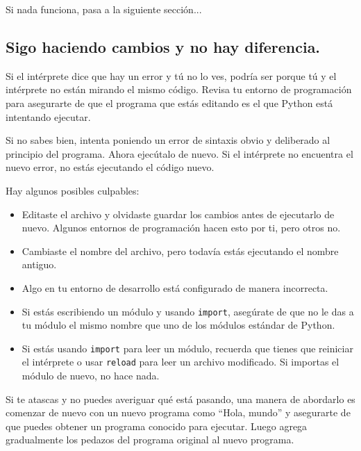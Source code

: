 \documentclass[10pt]{book}
\begin{document}
Si nada funciona, pasa a la siguiente sección...


\subsection{Sigo haciendo cambios y no hay diferencia.}

Si el intérprete dice que hay un error y tú no lo ves,
podría ser porque tú y el intérprete no están mirando el mismo
código.  Revisa tu entorno de programación para asegurarte de que el
programa que estás editando es el que Python está intentando ejecutar.

Si no sabes bien, intenta poniendo un error de sintaxis obvio y deliberado
al principio del programa.  Ahora ejecútalo de nuevo.  Si el
intérprete no encuentra el nuevo error, no estás ejecutando el
código nuevo.

Hay algunos posibles culpables:

\begin{itemize}

\item Editaste el archivo y olvidaste guardar los cambios antes de
ejecutarlo de nuevo.  Algunos entornos de programación hacen esto
por ti, pero otros no.

\item Cambiaste el nombre del archivo, pero todavía estás ejecutando
el nombre antiguo.

\item Algo en tu entorno de desarrollo está configurado
de manera incorrecta.

\item Si estás escribiendo un módulo y usando {\tt import},
asegúrate de que no le das a tu módulo el mismo nombre que uno
de los módulos estándar de Python.

\item Si estás usando {\tt import} para leer un módulo, recuerda
que tienes que reiniciar el intérprete o usar {\tt reload}
para leer un archivo modificado.  Si importas el módulo de nuevo,
no hace nada.

\end{itemize}

Si te atascas y no puedes averiguar qué está pasando, una
manera de abordarlo es comenzar de nuevo con un nuevo programa como ``Hola, mundo''
y asegurarte de que puedes obtener un programa conocido para ejecutar.  Luego agrega gradualmente
los pedazos del programa original al nuevo programa.
\end{document}
